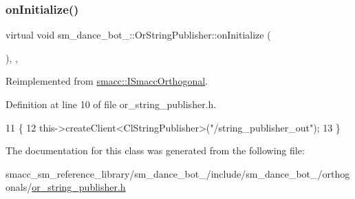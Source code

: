 \subsubsection{\texorpdfstring{on\+Initialize()}{onInitialize()}}
{\footnotesize\ttfamily virtual void sm\+\_\+dance\+\_\+bot\+\_\+::\+Or\+String\+Publisher\+::on\+Initialize (\begin{DoxyParamCaption}{ }\end{DoxyParamCaption})\hspace{0.3cm}{\ttfamily [inline]}, {\ttfamily [override]}, {\ttfamily [virtual]}}



Reimplemented from \hyperlink{classsmacc_1_1ISmaccOrthogonal_a6bb31c620cb64dd7b8417f8705c79c7a}{smacc\+::\+I\+Smacc\+Orthogonal}.



Definition at line 10 of file or\+\_\+string\+\_\+publisher.\+h.


\begin{DoxyCode}
11     \{
12         this->createClient<ClStringPublisher>(\textcolor{stringliteral}{"/string\_publisher\_out"});
13     \}
\end{DoxyCode}


The documentation for this class was generated from the following file\+:\begin{DoxyCompactItemize}
\item 
smacc\+\_\+sm\+\_\+reference\+\_\+library/sm\+\_\+dance\+\_\+bot\+\_/include/sm\+\_\+dance\+\_\+bot\+\_/orthogonals/\hyperlink{sm__dance__bot__2_2include_2sm__dance__bot__2_2orthogonals_2or__string__publisher_8h}{or\+\_\+string\+\_\+publisher.\+h}\end{DoxyCompactItemize}
